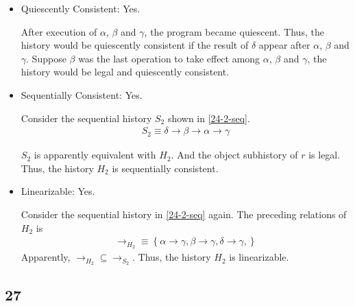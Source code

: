 \documentclass[]{article}
\begin{document}
\begin{itemize}
    \item Quiescently Consistent: Yes.

        After execution of $\alpha$, $\beta$ and $\gamma$, the program became
        quiescent. Thus, the history would be quiescently consistent if the
        result of $\delta$ appear after $\alpha$, $\beta$ and $\gamma$. Suppose
        $\beta$ was the last operation to take effect among $\alpha$, $\beta$
        and $\gamma$, the history would be legal and quiescently consistent.

    \item Sequentially Consistent: Yes.

        Consider the sequential history $S_2$ shown in \cref{24-2-seq}.
        \begin{align}
            \label{24-2-seq}
            S_2 \equiv \delta \rightarrow \beta \rightarrow \alpha \rightarrow \gamma
        \end{align}

        $S_2$ is apparently equivalent with $H_2$. And the object subhistory of
        $r$ is legal. Thus, the history $H_2$ is sequentially consistent.

    \item Linearizable: Yes.

        Consider the sequential history in \cref{24-2-seq} again. The preceding
        relations of $H_2$ is
        \begin{align}
            \rightarrow_{H_2} \equiv \left\{ 
                \alpha \rightarrow \gamma,
                \beta \rightarrow \gamma,
                \delta \rightarrow \gamma,
            \right\}
        \end{align}
        Apparently, $\rightarrow_{H_2} \subseteq \rightarrow_{S_2}$. Thus, the
        history $H_2$ is linearizable.
\end{itemize}

\subsection{27}
\end{document}
